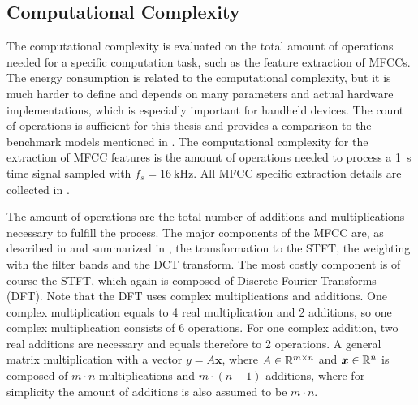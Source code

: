 
\subsection{Computational Complexity}\label{sec:signal_mfcc_complexity}
The computational complexity is evaluated on the total amount of operations needed for a specific computation task, such as the feature extraction of MFCCs.
The energy consumption is related to the computational complexity, but it is much harder to define and depends on many parameters and actual hardware implementations, which is especially important for handheld devices.
The count of operations is sufficient for this thesis and provides a comparison to the benchmark models mentioned in .
The computational complexity for the extraction of MFCC features is the amount of operations needed to process a \SI{1}{\second} time signal sampled with $f_s = \SI{16}{\kilo\hertz}$.
All MFCC specific extraction details are collected in .

The amount of operations are the total number of additions and multiplications necessary to fulfill the process.
The major components of the MFCC are, as described in  and summarized in , the transformation to the STFT, the weighting with the filter bands and the DCT transform.
The most costly component is of course the STFT, which again is composed of Discrete Fourier Transforms (DFT).
Note that the DFT uses complex multiplications and additions.
One complex multiplication equals to 4 real multiplication and 2 additions, so one complex multiplication consists of 6 operations.
For one complex addition, two real additions are necessary and equals therefore to 2 operations.
A general matrix multiplication with a vector $y = A \bm{x}$, where $A \in \mathbb{R}^{m \times n}$ and $\bm{x} \in \mathbb{R}^n$ is composed of $m \cdot n$ multiplications and $m \cdot (n - 1)$ additions, where for simplicity the amount of additions is also assumed to be $m \cdot n$.

